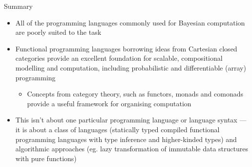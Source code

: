 \documentclass[mathserif,handout]{beamer}
\begin{document}
\begin{frame}{Summary}
\protect\hypertarget{summary}{}

\begin{itemize}

\item
  All of the programming languages commonly used for Bayesian
  computation are poorly suited to the task
\item
  Functional programming languages borrowing ideas from \alert{Cartesian
  closed categories} provide an excellent foundation for scalable, compositional
  modelling and computation, including probabilistic and differentiable (array) programming
  \begin{itemize}
  
  \item
    Concepts from category theory, such as \alert{functors},
    \alert{monads} and \alert{comonads} provide a useful framework for
    organising computation
  \end{itemize}
\item
  This isn't about one particular programming language or language syntax --- it is about a class of
  languages (statically typed compiled functional programming languages with type
    inference and higher-kinded types) and algorithmic approaches (eg. lazy transformation of immutable data structures with pure functions)
\end{itemize}

\end{frame}
\end{document}
